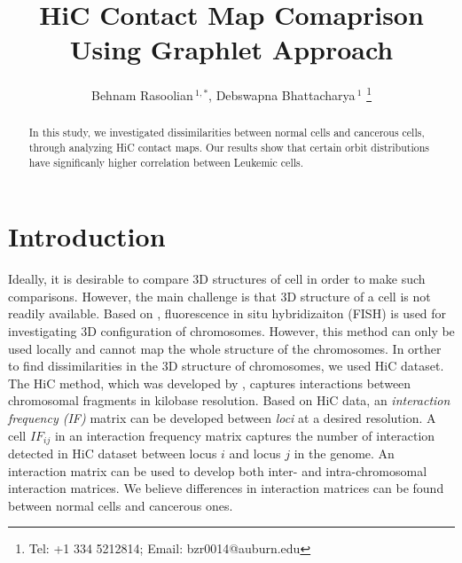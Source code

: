 \documentclass[a4,center,fleqn]{NAR}
\begin{document}
\title{HiC Contact Map Comaprison Using Graphlet Approach}

\author{%
    Behnam Rasoolian\,$^{1,*}$,
    Debswapna Bhattacharya\,$^{1}$
    \footnote{
    Tel: +1 334 5212814; Email: bzr0014@auburn.edu}}

    \address{%
        $^{1}$ Auburn University
        }


            \maketitle

\begin{abstract}

In this study, we investigated
dissimilarities between normal cells and cancerous cells,
through analyzing HiC contact maps. 
Our results show that certain orbit distributions
have significanly higher correlation 
between Leukemic cells.

\end{abstract}

\section{Introduction}

Ideally, it is desirable to compare 3D structures of 
cell in order to make such comparisons.
However, the main challenge is that 
3D structure of a cell is not readily available. Based on
\cite{adhikari2016chromosome3d}, fluorescence in situ hybridizaiton
(FISH) is used for investigating 3D configuration of chromosomes.
However, this method can only be used locally and cannot map
the whole structure of the chromosomes.
In orther to find dissimilarities in the 3D structure of 
chromosomes, we used HiC dataset.
The HiC method, which was developed by 
\cite{lieberman2009comprehensive}, captures interactions between 
chromosomal fragments in kilobase resolution. Based on HiC data, an
\textit{interaction frequency (IF) } matrix can be developed 
between \textit{loci} at a desired resolution.
A cell $IF_{ij}$ in an interaction frequency matrix captures 
the number of interaction detected
in HiC dataset between locus $i$ and locus $j$ in the genome.
An interaction matrix can be used to develop both 
inter- and intra-chromosomal interaction matrices.
We believe differences in interaction matrices can 
be found between normal cells and cancerous ones.
\end{document}
